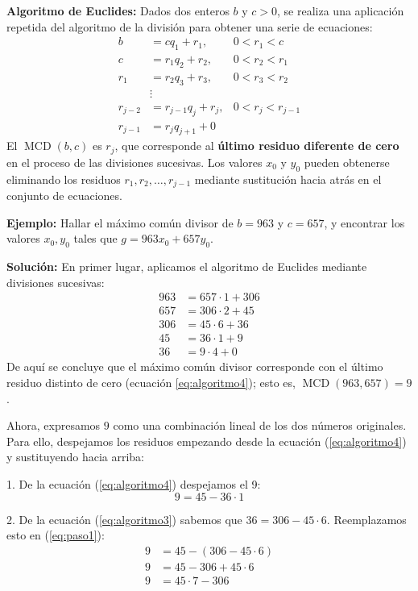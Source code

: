 \begin{enumerate}
    \textbf{Algoritmo de Euclides:} Dados dos enteros $b$ y $c>0$, se realiza una aplicación repetida del algoritmo de la división para obtener una serie de ecuaciones:
\begin{align}
b &= c q_1 + r_1, & 0 < r_1 < c \nonumber\\
c &= r_1 q_2 + r_2, & 0 < r_2 < r_1 \nonumber\\
r_1 &= r_2 q_3 + r_3, & 0 < r_3 < r_2 \nonumber\\
&\vdots & \nonumber \\
r_{j-2} &= r_{j-1} q_j + r_j, & 0 < r_j < r_{j-1} \nonumber\\
r_{j-1} &= r_j q_{j+1} + 0
\end{align}
El $\operatorname{MCD}(b,c)$ es $r_j$, que corresponde al \textbf{último residuo diferente de cero} en el proceso de las divisiones sucesivas. Los valores $x_0$ y $y_0$ pueden obtenerse eliminando los residuos $r_1, r_2, \dots, r_{j-1}$ mediante sustitución hacia atrás en el conjunto de ecuaciones.

\textbf{Ejemplo:} Hallar el máximo común divisor de $b=963$ y $c=657$, y encontrar los valores $x_0, y_0$ tales que $g=963x_0+657y_0$.

\textbf{Solución:} En primer lugar, aplicamos el algoritmo de Euclides mediante divisiones sucesivas:
\begin{align}
963 &= 657\cdot 1+306 \label{eq:algoritmo1}\\
657 &= 306\cdot 2+45 \label{eq:algoritmo2}\\
306 &= 45\cdot 6+36 \label{eq:algoritmo3}\\
45 &= 36\cdot 1+9 \label{eq:algoritmo4}\\
36 &= 9\cdot 4 + 0 \nonumber
\end{align}
De aquí se concluye que el máximo común divisor corresponde con el último residuo distinto de cero (ecuación \ref{eq:algoritmo4}); esto es, $\operatorname{MCD}(963,657)=9$.

Ahora, expresamos $9$ como una combinación lineal de los dos números originales. Para ello, despejamos los residuos empezando desde la ecuación (\ref{eq:algoritmo4}) y sustituyendo hacia arriba:

1. De la ecuación (\ref{eq:algoritmo4}) despejamos el 9:
\begin{equation}\label{eq:paso1}
    9 = 45 - 36 \cdot 1
\end{equation}

2. De la ecuación (\ref{eq:algoritmo3}) sabemos que $36 = 306 - 45\cdot 6$. Reemplazamos esto en (\ref{eq:paso1}):
\begin{align*}
    9 &= 45 - (306 - 45\cdot 6) \\
    9 &= 45 - 306 + 45\cdot 6 \\
    9 &= 45\cdot 7 - 306
\end{align*}


\end{enumerate}
